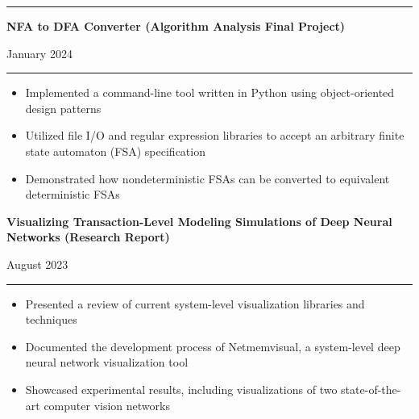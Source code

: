 \documentclass[letter]{article}
\begin{document}
    \medskip
    \vspace{4pt}
    \hrule height 1pt
    \vspace{4pt}

    \noindent
    \begin{minipage}[c]{0.8\linewidth}
        \noindent \textbf{NFA to DFA Converter (Algorithm Analysis Final Project)}
    \end{minipage}
    \begin{minipage}[c]{0.19\linewidth}
        \begin{flushright}
            January 2024
        \end{flushright}
    \end{minipage}
    \vspace{4pt}
    \hrule
    \vspace{4pt}
    \noindent
    \begin{itemize}[noitemsep, topsep=0pt]
        \item Implemented a command-line tool written in Python using object-oriented design patterns
        \item Utilized file I/O and regular expression libraries to accept an arbitrary finite state automaton (FSA) specification
        \item Demonstrated how nondeterministic FSAs can be converted to equivalent deterministic FSAs
    \end{itemize}
    \medskip

    \noindent
    \begin{minipage}[c]{0.85\linewidth}
    \noindent \textbf{Visualizing Transaction-Level Modeling Simulations of Deep Neural Networks (Research Report)}
    \end{minipage}
    \begin{minipage}[c]{0.14\linewidth}
        \begin{flushright}
            August 2023
        \end{flushright}
    \end{minipage}
    \vspace{4pt}
    \hrule
    \vspace{4pt}
    \noindent
    \begin{itemize}[noitemsep, topsep=0pt]
        \item Presented a review of current system-level visualization libraries and techniques
        \item Documented the development process of Netmemvisual, a system-level deep neural network visualization tool
        \item Showcased experimental results, including visualizations of two state-of-the-art computer vision networks
    \end{itemize}
    \medskip
\end{document}
